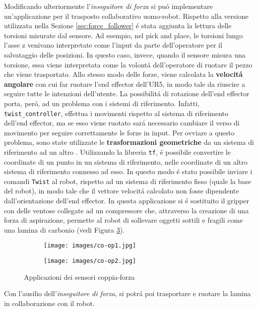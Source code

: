 Modificando ulteriormente l'\textit{inseguitore di forza} si pu\'{o} implementare un'applicazione 
per il trasposto collaborativo uomo-robot\footnotemark{}. Rispetto alla versione utilizzata nella Sezione \ref{sec:force_follower} \'{e} stata aggiunta 
la lettura delle torsioni misurate dal sensore. 
Ad esempio, nel pick and place, le torsioni lungo l'asse z venivano interpretate come l'input da parte dell'operatore per il salvataggio 
delle posizioni. In questo caso, invece, quando il sensore misura una torsione, essa viene interpretata come la volont\'{a} 
dell'operatore di ruotare il pezzo che viene trasportato.
Allo stesso modo delle forze, viene calcolata la \textbf{velocit\'{a} angolare} 
con cui far ruotare l'end effector dell'UR5, in modo tale da riuscire a seguire tutte le intenzioni dell'utente. 
La possibilit\'{a} di rotazione dell'end effector porta, per\'{o}, ad un problema con i sistemi di riferimento. 
Infatti, \verb|twist_controller|, effettua i movimenti rispetto al sistema di riferimento dell'end effector, ma se esso viene ruotato 
sar\'{a} necessario cambiare il verso di movimento per seguire correttamente le forze in input. Per ovviare a questo 
problema, sono state utilizzate le \textbf{trasformazioni geometriche} da un sistema di riferimento ad un altro \cite{foote2013tf}. 
Utilizzando la libreria \verb|tf|, \'{e} possibile convertire le coordinate di un punto in un sistema di riferimento, nelle 
coordinate di un altro sistema di riferimento connesso ad esso. In questo modo \'{e} stato possibile inviare i comandi 
\verb|Twist| al robot, rispetto ad un sistema di riferimento fisso (quale la base del robot), in modo tale che il vettore velocit\'{a} 
calcolato non fosse dipendente dall'orientazione dell'end effector. 
In questa applicazione si \'{e} sostituito il gripper con delle ventose collegate ad un compressore che, attraverso la creazione di 
una forza di aspirazione, permette al robot di sollevare oggetti sottili e fragili come una lamina di carbonio (vedi Figura \ref{fig:co-op}).
\begin{figure}[H]
    \centering
    \begin{subfigure}[b]{0.45\textwidth}
        \texttt{[image: images/co-op1.jpg]}
        \label{fig:co-op1}
    \end{subfigure}
    \qquad
    \begin{subfigure}[b]{0.45\textwidth}
        \texttt{[image: images/co-op2.jpg]}
        \label{fig:co-op2}
    \end{subfigure}
    \caption{Applicazioni dei sensori coppia-forza}\label{fig:co-op}
\end{figure}
Con l'ausilio dell'\textit{inseguitore di forza}, si potr\'{a} poi trasportare e ruotare la lamina in collaborazione con il robot. 
